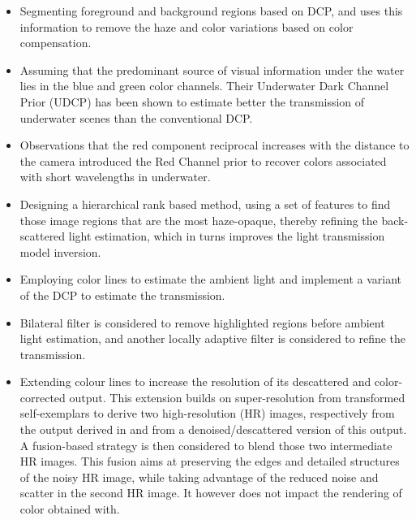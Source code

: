 \documentclass[hidelinks, 12pt]{report}
\begin{document}
\begin{itemize}
\item{Segmenting foreground and background regions based on DCP, and uses this information to remove the haze and color variations based on color compensation.}
\item{Assuming that the predominant source of visual information under the water lies in the blue and green color channels. Their Underwater Dark Channel Prior (UDCP) has been shown to estimate better the transmission of underwater scenes than the conventional DCP.}
\item{Observations that the red component reciprocal increases with the distance to the camera introduced the Red Channel prior to recover colors associated with short wavelengths in underwater.}
\item{Designing a hierarchical rank based method, using a set of features to find those image regions that are the most haze-opaque, thereby refining the back-scattered light estimation, which in turns improves the light transmission model inversion.}
\item{Employing color lines to estimate the ambient light and implement a variant of the DCP to estimate the transmission.}
\item{Bilateral filter is considered to remove highlighted regions before ambient light estimation, and another locally adaptive filter is considered to refine the transmission.}
\item{Extending colour lines to increase the resolution of its descattered and color-corrected output. This extension builds on super-resolution from transformed self-exemplars to derive two high-resolution (HR) images, respectively from the output derived in and from a denoised/descattered version of this output. A fusion-based strategy is then considered to blend those two intermediate HR images. This fusion aims at preserving the edges and detailed structures of the noisy HR image, while taking advantage of the reduced noise and scatter in the second HR image. It however does not impact the rendering of color obtained with.}
\end{itemize}
\end{document}
